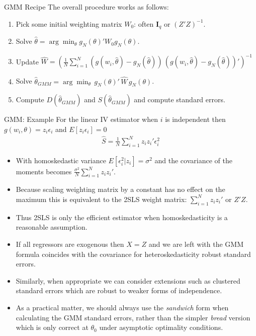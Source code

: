 \documentclass[aspectratio=169]{beamer}
\begin{document}
\begin{frame}{GMM Recipe}
\noindent The overall procedure works as follows:
\begin{enumerate}
\item Pick some initial weighting matrix $W_0$: often $\mathbf{I}_q$ or $(Z'Z)^{-1}$.
\item Solve $\hat{\theta} = \arg \min_{\theta} g_N(\theta)' W_0  g_N(\theta)$.
\item Update $\hat{W} = \left(\frac{1}{N} \sum_{i=1}^N (g(w_i,\hat{\theta}) - g_N(\hat{\theta}))  \, (g(w_i,\hat{\theta}) - g_N(\hat{\theta}))'\right)^{-1}$
\item Solve $\hat{\theta}_{GMM} = \arg \min_{\theta}\, g_N(\theta)' \, \hat{W} \, g_N(\theta)$.
\item Compute $D(\hat{\theta}_{GMM})$ and $S(\hat{\theta}_{GMM})$ and compute standard errors.
\end{enumerate}
\end{frame}

\begin{frame}{GMM: Example}\footnotesize
For the linear IV estimator when $i$ is independent then $g(w_i,\theta) = z_i \epsilon_i$ and $E[z_i \epsilon_i]=0$
\begin{eqnarray*}
\hat{S}=\frac{1}{N} \sum_{i=1}^N z_i z_i' \epsilon_i^2
\end{eqnarray*}
\begin{itemize}
\item With homoskedastic variance $E[\epsilon_i^2 | z_i] = \sigma^2$ and the covariance of the moments becomes $\frac{\sigma^2}{N} \sum_{i=1}^N z_i z_i'$. 
\item Because scaling weighting matrix by a constant has no effect on the maximum this is equivalent to the 2SLS weight matrix: $\sum_{i=1}^N z_i z_i'$ or $Z'Z$. 
\item Thus 2SLS is only the efficient estimator when \alert{homoskedasticity} is a reasonable assumption.
\item If all regressors are exogenous then $X=Z$ and we are left with the GMM formula coincides with the covariance for heteroskedasticity robust standard errors.
\item Similarly, when appropriate we can consider extensions such as \alert{clustered standard errors} which are robust to weaker forms of independence.
\item As a practical matter, we should always use the \textit{sandwich} form when calculating the GMM standard errors, rather than the simpler \textit{bread} version which is only correct at $\theta_0$ under asymptotic optimality conditions.
\end{itemize}
\end{frame}
\end{document}
